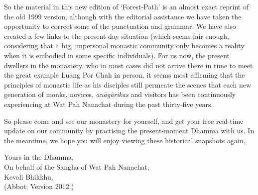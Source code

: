 So the material in this new edition of `Forest-Path' is an almost exact
reprint of the old 1999 version, although with the editorial assistance
we have taken the opportunity to correct some of the punctuation and
grammar. We have also created a few links to the present-day situation
(which seems fair enough, considering that a big, impersonal monastic
community only becomes a reality when it is embodied in some specific
individuals). For us now, the present dwellers in the monastery, who in
most cases did not arrive there in time to meet the great example Luang
Por Chah in person, it seems most affirming that the principles of
monastic life as his disciples still permeate the scenes that each new
generation of monks, novices, \emph{anāgārikas} and visitors has been
continuously experiencing at Wat Pah Nanachat during the past
thirty-five years.

So please come and see our monastery for yourself, and get your free
real-time update on our community by practising the present-moment
Dhamma with us. In the meantime, we hope you will enjoy viewing these
historical snapshots again,

Yours in the Dhamma,\\
On behalf of the Sangha of Wat Pah Nanachat,\\
Kevali Bhikkhu,\\
(Abbot; Version 2012.)

